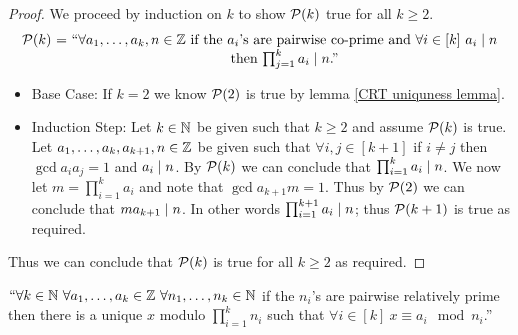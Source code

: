         \begin{proof}
            We proceed by induction on $k$ to show $\mathcal{P}(k)$ true for all $k \ge 2$.
            \[\begin{array}{r@{\ = \ }c}
                \inductive{P}{k} & ``\mbox{$\forall a_1, \dots, a_k, n \in \set{Z}$ if the $a_i$'s are
                                    pairwise co-prime and $\forall i \in [k] \ \divides{a_i}{n}$} \\
                \multicolumn{1}{l}{} & \mbox{then $\divides{\prod_{j = 1}^{k} a_i}{n}$.''}
            \end{array}\]
            \begin{itemize}
                \item
                    Base Case: If $k = 2$ we know $\mathcal{P}(2)$ is true by lemma \ref{CRT uniquness lemma}.
                \item
                    Induction Step: Let $k \in \mathbb{N}$ be given such that $k \ge 2$ and assume
                    $\mathcal{P}(k)$ is true. Let $a_1, \dots, a_k, a_{k + 1}, n \in \mathbb{Z}$ be
                    given such that $\forall i, j \in [k + 1]$ if $i \neq j$ then $\gcd{a_i}{a_j} = 1$
                    and $a_i \mid n$. By $\mathcal{P}(k)$ we can conclude that
                    $\prod_{i = 1}^k a_i \mid n$. We now let $m = \prod_{i = 1}^k a_i$ and note
                    that $\gcd{a_{k + 1}}{m} = 1$. Thus by $\mathcal{P}(2)$ we can conclude that
                    $ma_{k + 1} \mid n$. In other words $\prod_{i = 1}^{k + 1} a_i \mid n$;
                    thus $\mathcal{P}(k + 1)$ is true as required.
            \end{itemize}
            Thus we can conclude that $\mathcal{P}(k)$ is true for all $k \ge 2$ as required. \QED
        \end{proof}
        \begin{theorem}
            $``\forall k \in \mathbb{N} \ \forall a_1, \dots, a_k \in \mathbb{Z} \
            \forall n_1, \dots, n_k \in \mathbb{N}$ if  the $n_i$'s are pairwise relatively prime
            then there is a unique $x$ modulo $\prod_{i = 1}^{k} n_i$ such that $\forall i \in [k] \ 
            x \equiv a_i \mod n_i$.''
            \label{Chinese Remainder Theorem}
        \end{theorem}
